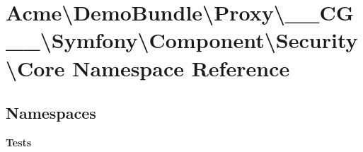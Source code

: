 \section{Acme\textbackslash{}Demo\+Bundle\textbackslash{}Proxy\textbackslash{}\+\_\+\+\_\+\+C\+G\+\_\+\+\_\+\textbackslash{}Symfony\textbackslash{}Component\textbackslash{}Security\textbackslash{}Core Namespace Reference}
\label{namespace_acme_1_1_demo_bundle_1_1_proxy_1_1_____c_g_____1_1_symfony_1_1_component_1_1_security_1_1_core}
\subsection*{Namespaces}
\begin{DoxyCompactItemize}
\item 
 {\bf Tests}
\end{DoxyCompactItemize}
